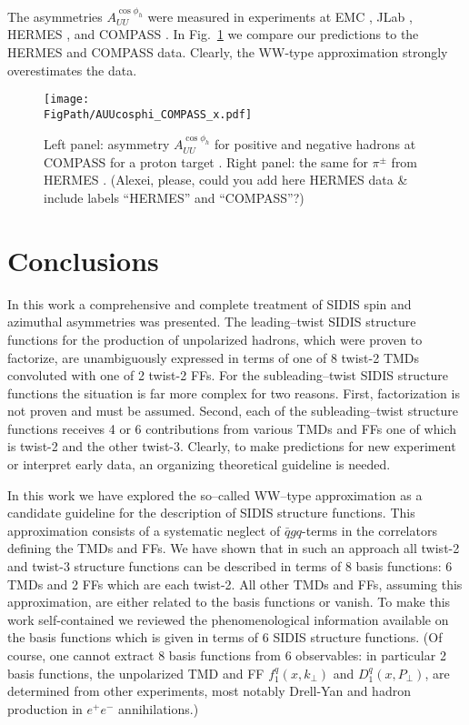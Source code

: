 \documentclass[a4paper,11pt]{article}
\newcommand{\red}[1]{{\color{red} #1}}
\def\kperp{k_\perp}
\def\pperp{P_\perp}
\newcommand*{\FigPath}{./figs}%
\begin{document}
The asymmetries $A_{UU}^{\cos\phi_h}$ were measured in experiments at
EMC \cite{Aubert:1983cz}, JLab \cite{Osipenko:2008aa,Mkrtchyan:2007sr}, 
HERMES \cite{Airapetian:2012yg}, and COMPASS \cite{Adolph:2014pwc}.
In Fig.~\ref{auucosphi_jlab} we compare our predictions 
to the HERMES and COMPASS data. Clearly, the WW-type
approximation strongly overestimates the data.


\begin{figure}[ht]
\centering
\texttt{[image: \\FigPath/AUUcosphi\_COMPASS\_x.pdf]} 
\caption{\label{auucosphi_jlab} 
	Left panel: asymmetry $A_{UU}^{\cos\phi_h}$ for positive and negative 
	hadrons at COMPASS for a proton target \cite{Adolph:2014pwc}. Right 
	panel: the same for $\pi^\pm$ from HERMES \cite{Airapetian:2012yg}.
	\red{(Alexei, please, could you add here HERMES data \& include
	labels ``HERMES'' and ``COMPASS''?)}}
\end{figure}


\newpage
\section{Conclusions}
\label{Sec-8:conclusions}

In this work a comprehensive and complete treatment of SIDIS
spin and azimuthal asymmetries was presented. The leading--twist
SIDIS structure functions for the production of unpolarized hadrons,
which were proven to factorize, are unambiguously expressed in terms 
of one of 8 twist-2 TMDs convoluted with one of 2 twist-2 FFs.
For the subleading--twist SIDIS structure functions the situation
is far more complex for two reasons. First, factorization is not 
proven and must be assumed. 
Second, each of the subleading--twist structure functions
receives 4 or 6 contributions from various TMDs and FFs one of
which is twist-2 and the other twist-3. Clearly, to make 
predictions for new experiment or interpret early data, an
organizing theoretical guideline is needed.

In this work we have explored the so--called WW--type approximation
as a candidate guideline for the description of SIDIS structure
functions. This approximation consists of a systematic neglect 
of $\bar{q}gq$-terms in the
correlators defining the TMDs and FFs. We have shown that in such
an approach all twist-2 and twist-3 structure functions can be
described in terms of 8 basis functions: 6 TMDs and 2 FFs
which are each twist-2. All other TMDs and FFs, assuming this
approximation, are either related to the basis functions or
vanish. To make this work self-contained
we reviewed the phenomenological information available
on the basis functions which is given in terms of 6 SIDIS
structure functions. (Of course, one cannot extract 8 basis
functions from 6 observables: in particular 2 basis functions,
the unpolarized TMD and FF $f_1^q(x,\kperp)$ and $D_1^q(x,\pperp)$,
are determined from other experiments, most notably Drell-Yan
and hadron production in $e^+e^-$ annihilations.)
\end{document}
